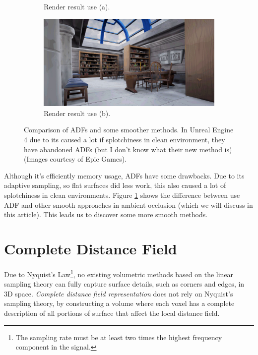 \begin{figure}
\begin{subfigure}[b]{0.5\textwidth}
		\caption{Render result use (a).}
	\end{subfigure}
	\begin{subfigure}[b]{0.5\textwidth}
		\includegraphics{graphics/df/DFAO_Scene_NewMethod}
		\caption{Render result use (b).}
	\end{subfigure}
	\caption{Comparison of ADFs and some smoother methods. In Unreal Engine 4 due to its caused a lot if splotchiness in clean environment, they have abandoned ADFs (but I don't know what their new method is)(Images courtesy of Epic Games).}
	\label{f:ue4-adf-problem}
\end{figure}

Although it's efficiently memory usage, ADFs have some drawbacks. Due to its adaptive sampling, so flat surfaces did less work, this also caused a lot of splotchiness in clean environments. Figure \ref{f:ue4-adf-problem} shows the difference between use ADF and other smooth approaches in ambient occlusion (which we will discuss in this article). This leads us to discover some more smooth methods.



\section{Complete Distance Field}
Due to Nyquist's Law\footnote{The sampling rate must be at least two times the highest frequency component in the signal.}, no existing volumetric methods based on the linear sampling theory can fully capture surface details, such as corners and edges, in 3D space. \textit{Complete distance field representation} does not rely on Nyquist's sampling theory, by constructing a volume where each voxel has a complete description of all portions of surface that affect the local distance field.

